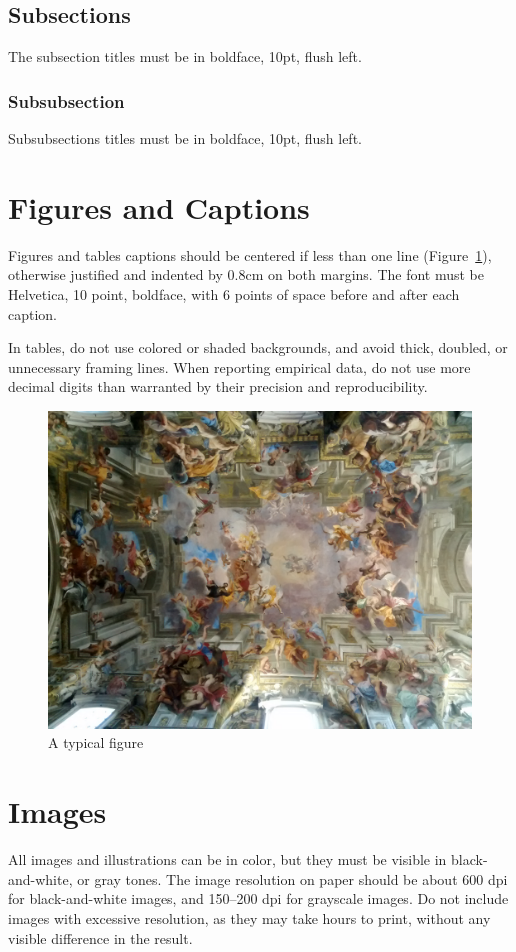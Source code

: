\documentclass[10pt,times,twocolumn]{article}
\begin{document}
\subsection{Subsections}

The subsection titles must be in boldface, 10pt, flush left.

\subsubsection{Subsubsection}

Subsubsections titles must be in boldface, 10pt, flush left.


\section{Figures and Captions}

Figures and tables captions should be centered if less than one line
(Figure~\ref{fig:exampleFig}), otherwise justified and indented by
0.8cm on both margins. The font must be Helvetica, 10 point, boldface,
with 6 points of space before and after each caption.

In tables, do not use colored or shaded backgrounds, and avoid thick,
doubled, or unnecessary framing lines. When reporting empirical data,
do not use more decimal digits than warranted by their precision and
reproducibility.

\begin{figure}[h]
\centering
  \includegraphics[width=.5\textwidth]{fig/ceiling.jpg}
\caption{A typical figure}
\label{fig:exampleFig}
\end{figure}


\section{Images}

All images and illustrations can be in color, but they must be visible in black-and-white, or gray tones.
The image resolution on paper should be about 600 dpi for black-and-white images, and 150--200 dpi for grayscale images. Do not include images with excessive resolution, as they may take hours to print, without any visible difference in the result.
\end{document}
